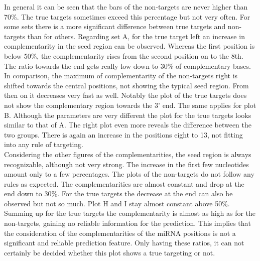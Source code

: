 \documentclass[12pt,  a4paper]{report}
\begin{document}
In general it can be seen that the bars of the non-targets are never higher than 70\%. The true targets sometimes exceed this percentage but not very often. For some sets there is a more significant difference between true targets and non-targets than for others. Regarding set A, for the true target left an increase in complementarity in the seed region can be observed. Whereas the first position is below 50\%, the complementarity rises from the second position on to the 8th. The ratio towards the end gets really low down to 30\% of complementary bases. In comparison, the maximum of complementarity of the non-targets right is shifted towards the central positions, not showing the typical seed region. From then on it decreases very fast as well. Notably the plot of the true targets does not show the complementary region towards the 3' end. The same applies for plot B. Although the parameters are very different the plot for the true targets looks similar to that of A. The right plot even more reveals the difference between the two groups. There is again an increase in the positions eight to 13, not fitting into any rule of targeting. \\

Considering the other figures of the complementarities, the seed region is always recognizable, although not very strong. The increase in the first few nucleotides amount only to a few percentages. The plots of the non-targets do not follow any rules as expected. The complementarities are almost constant and drop at the end down to 30\%. For the true targets the decrease at the end can also be observed but not so much. Plot H and I stay almost constant above 50\%.\\

Summing up for the true targets the complementarity is almost as high as for the non-targets, gaining no reliable information for the prediction. This implies that the consideration of the complementarities of the miRNA positions is not a significant and reliable prediction feature. Only having these ratios, it can not certainly be decided whether this plot shows a true targeting or not. \\
\end{document}
